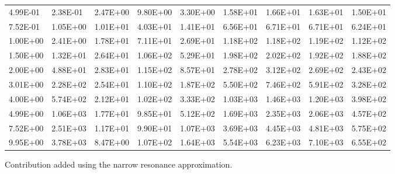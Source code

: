 \begin{table}
\begin{center}
\begin{threeparttable}
\begin{tabular}{@{}lllllllll@{}}
4.99E-01 & 2.38E-01                & 2.47E+00                 & 9.80E+00                & 3.30E+00                & 1.58E+01          & 1.66E+01                  & 1.63E+01                & 1.50E+01                  \\
7.52E-01 & 1.05E+00                & 1.01E+01                 & 4.03E+01                & 1.41E+01                & 6.56E+01          & 6.71E+01                  & 6.71E+01                & 6.24E+01                  \\
1.00E+00 & 2.41E+00                & 1.78E+01                 & 7.11E+01                & 2.69E+01                & 1.18E+02          & 1.18E+02                  & 1.19E+02                & 1.12E+02                  \\
1.50E+00 & 1.32E+01                & 2.64E+01                 & 1.06E+02                & 5.29E+01                & 1.98E+02          & 2.02E+02                  & 1.92E+02                & 1.88E+02                  \\
2.00E+00 & 4.88E+01                & 2.83E+01                 & 1.15E+02                & 8.57E+01                & 2.78E+02          & 3.12E+02                  & 2.69E+02                & 2.43E+02                  \\
3.01E+00 & 2.28E+02                & 2.54E+01                 & 1.10E+02                & 1.87E+02                & 5.50E+02          & 7.46E+02                  & 5.91E+02                & 3.28E+02                  \\
4.00E+00 & 5.74E+02                & 2.12E+01                 & 1.02E+02                & 3.33E+02                & 1.03E+03          & 1.46E+03                  & 1.20E+03                & 3.98E+02                  \\
4.99E+00 & 1.06E+03                & 1.77E+01                 & 9.85E+01                & 5.12E+02                & 1.69E+03          & 2.35E+03                  & 2.06E+03                & 4.57E+02                  \\
7.52E+00 & 2.51E+03                & 1.17E+01                 & 9.90E+01                & 1.07E+03                & 3.69E+03          & 4.45E+03                  & 4.81E+03                & 5.75E+02                  \\
9.95E+00 & 3.78E+03                & 8.47E+00                 & 1.07E+02                & 1.64E+03                & 5.54E+03          & 6.23E+03                  & 7.10E+03                & 6.55E+02                  \\ \bottomrule
\end{tabular}
\begin{tablenotes}
\small 
\item * Contribution added using the narrow resonance approximation.
\end{tablenotes}
\end{threeparttable}
\label{table: reaction_rates}
\end{center}
\end{table}


